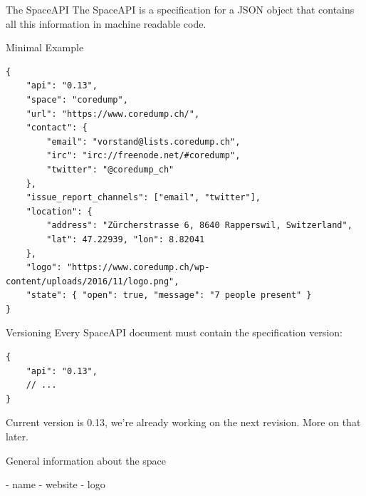 \begin{frame}[c]{The SpaceAPI}
	The SpaceAPI is a specification for a JSON object that contains all this
	information in machine readable code.
\end{frame}

\begin{frame}[fragile]{Minimal Example}
	\begin{verbatim}
{
    "api": "0.13",
    "space": "coredump",
    "url": "https://www.coredump.ch/",
    "contact": {
        "email": "vorstand@lists.coredump.ch",
        "irc": "irc://freenode.net/#coredump",
        "twitter": "@coredump_ch"
    },
    "issue_report_channels": ["email", "twitter"],
    "location": {
        "address": "Zürcherstrasse 6, 8640 Rapperswil, Switzerland",
        "lat": 47.22939, "lon": 8.82041
    },
    "logo": "https://www.coredump.ch/wp-content/uploads/2016/11/logo.png",
    "state": { "open": true, "message": "7 people present" }
}
	\end{verbatim}
\end{frame}

\begin{frame}[fragile]{Versioning}
Every SpaceAPI document must contain the specification version:

	\begin{verbatim}
{
    "api": "0.13",
    // ...
}
	\end{verbatim}

Current version is 0.13, we're already working on the next revision. More on
that later.
\end{frame}

\begin{frame}[fragile]{General information about the space}

	- name
	- website
	- logo
\end{frame}
